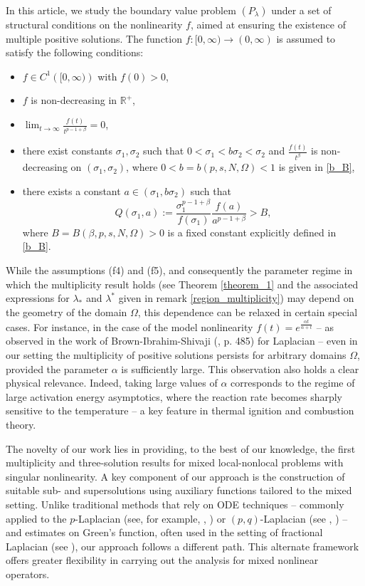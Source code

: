 \documentclass[reqno,oneside]{amsart}
\theoremstyle{definition}
\theoremstyle{remark}
\numberwithin{equation}{section}
\newcommand{\la} {\lambda}
\newcommand{\ba}{\beta}
\newcommand{\Om} {\Omega}
\newcommand{\sr}{\mathbb{R}}
\newcommand{\si}{\sigma}
\newcommand{\rar}{\rightarrow}
\begin{document}
In this article, we study the boundary value problem $(P_\lambda)$ under a set of structural conditions on the nonlinearity $f$, aimed at ensuring the existence of multiple positive solutions. The function $f:[0,\infty)\rightarrow (0,\infty)$ is assumed to satisfy the following conditions: 
\begin{itemize}
    \item[$(f1)$]  $f \in C^1 \left([0,\infty)\right)$ with $f(0)>0$,

    \item[$(f2)$] $f$ is non-decreasing in $\sr^+$,

    \item[$(f3)$] $\lim_{t\rar\infty} \frac{f(t)}{t^{p-1+\ba}} =0 $,

    \item[$(f4)$] there exist constants $\si_1, \si_2$ such that $0< \si_1 < b\si_2 <\si_2$ and $\frac{f(t)}{t^{\ba}}$ is non-decreasing on $(\si_1 , \si_2)$, where $0<b=b(p,s,N,\Om)<1$ is given in \eqref{b_B},

    \item[$(f5)$] there exists a constant $a\in (\sigma_1,b\sigma_2)$ such that
    \[Q(\si_1 , a):= \frac{\si_1^{p-1+\ba}}{f(\si_1)} \frac{f(a)}{a^{p-1+\ba}} >B,\]
    where $B=B(\ba,p,s,N,\Om)>0$ is a fixed constant explicitly defined in \eqref{b_B}.
\end{itemize}

While the assumptions (f4) and (f5), and consequently the parameter regime in which the multiplicity result holds (see Theorem \ref{theorem_1} and the associated expressions for $\la_*$ and $\la^*$ given in remark \ref{region_multiplicity}) may depend on the geometry of the domain $\Om$, this dependence can be relaxed in certain special cases. For instance, in the case of the model nonlinearity $f(t) = e^{\frac{\alpha t}{\alpha +t}}$ -- as observed in the work of Brown-Ibrahim-Shivaji (\cite{brown1981s}, p. 485) for Laplacian -- even in our setting the multiplicity of positive solutions persists for arbitrary domains $\Om$, provided the parameter $\alpha$ is sufficiently large. This observation also holds a clear physical relevance. Indeed, taking large values of $\alpha$ corresponds to the regime of large activation energy asymptotics, where the reaction rate becomes sharply sensitive to the temperature -- a key feature in thermal ignition and combustion theory.

The novelty of our work lies in providing, to the best of our knowledge, the first multiplicity and three-solution results for mixed local-nonlocal problems with singular nonlinearity. A key component of our approach is the construction of suitable sub- and supersolutions using auxiliary functions tailored to the mixed setting. Unlike traditional methods that rely on ODE techniques -- commonly applied to the $p$-Laplacian (see, for example, \cite{ramaswamy2004multiple}, \cite{ko2011multiplicity}) or $(p,q)$-Laplacian (see \cite{acharya2021existence}, \cite{arora2021multiplicity}) -- and estimates on Green's function, often used in the setting of fractional Laplacian (see \cite{giacomoni2019existence}), our approach follows a different path. This alternate framework offers greater flexibility in carrying out the analysis for mixed nonlinear operators.
\end{document}

